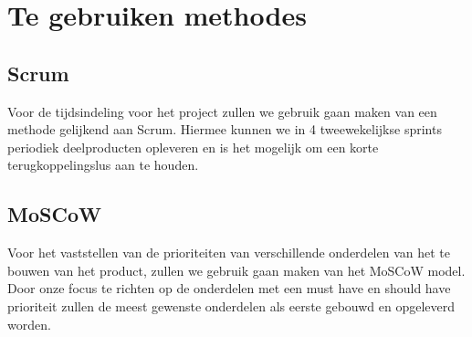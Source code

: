 \section{Te gebruiken methodes}

\subsection{Scrum}
Voor de tijdsindeling voor het project zullen we gebruik gaan maken van een methode gelijkend aan Scrum. Hiermee kunnen we in 4 tweewekelijkse sprints periodiek deelproducten opleveren en is het mogelijk om een korte terugkoppelingslus aan te houden. 

\subsection{MoSCoW}
Voor het vaststellen van de prioriteiten van verschillende onderdelen van het te bouwen van het product, zullen we gebruik gaan maken van het MoSCoW model. Door onze focus te richten op de onderdelen met een must have en should have prioriteit zullen de meest gewenste onderdelen als eerste gebouwd en opgeleverd worden.